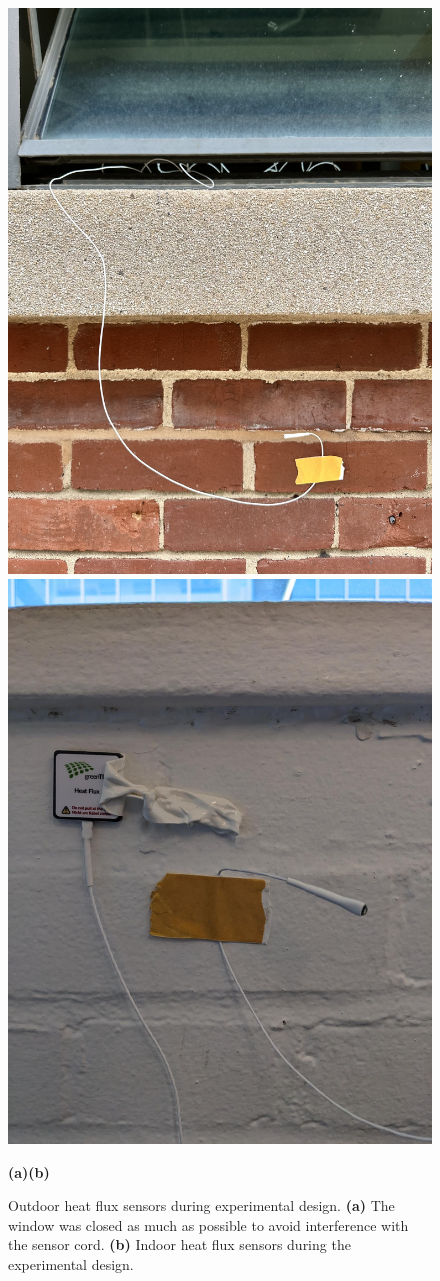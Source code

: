\begin{figure}[tb]
    \centering
    \includegraphics[width=0.495\linewidth]{Figures/expfig1.jpg}
    \includegraphics[width=0.495\linewidth]{Figures/expfig2.jpg}

    \hspace{3.5cm}\textbf{(a)}\hfill\textbf{(b)}\hspace{3.7cm}

     \caption[Experimental heat flux measurement setup]{Outdoor heat flux sensors during experimental design. \textbf{(a)} The window was closed as much as possible to avoid interference with the sensor cord. \textbf{(b)} Indoor heat flux sensors during the experimental design.}
   \label{fig:figexp1}
 \end{figure}







